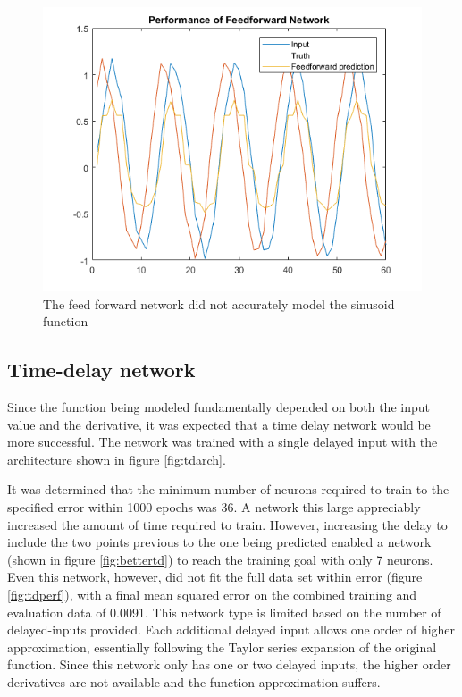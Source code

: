 \documentclass{IEEEtran}
\begin{document}
\begin{figure}[ht]
    \centering
    \includegraphics[width=\linewidth]{feedforward/feedforward_performance}
    \caption{The feed forward network did not accurately model the sinusoid function \label{fig:feedforward_performance}}
\end{figure}

\subsection{Time-delay network\label{sn:tdnn}}
Since the function being modeled fundamentally depended on both the input value and the derivative, it was expected that a time delay network would be more successful. The network was trained with a single delayed input with the architecture shown in figure \ref{fig:tdarch}.

It was determined that the minimum number of neurons required to train to the specified error within 1000 epochs was 36. A network this large appreciably increased the amount of time required to train. However, increasing the delay to include the two points previous to the one being predicted enabled a network (shown in figure \ref{fig:bettertd}) to reach the training goal with only 7 neurons. Even this network, however, did not fit the full data set within error (figure \ref{fig:tdperf}), with a final mean squared error on the combined training and evaluation data of 0.0091. This network type is limited based on the number of delayed-inputs provided. Each additional delayed input allows one order of higher approximation, essentially following the Taylor series expansion of the original function. Since this network only has one or two delayed inputs, the higher order derivatives are not available and the function approximation suffers.
\end{document}
